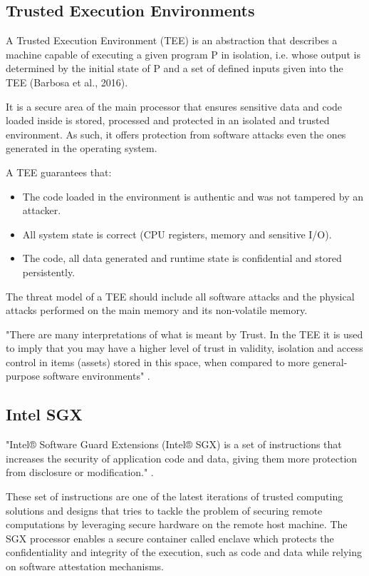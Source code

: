 \subsection{Trusted Execution Environments} %
\label{ssec:trusted_execution_environments}

A Trusted Execution Environment (\gls{TEE}) is an abstraction that describes a machine
capable of executing a given program P in isolation, i.e. whose output is determined by
the initial state of P and a set of defined inputs given into the \gls{TEE} (Barbosa et al., 2016).

It is a secure area of the main processor that ensures sensitive data and code loaded inside is stored, processed and protected in an isolated and trusted environment. As such, it offers protection from software attacks even the ones generated in the operating system.

A \gls{TEE} guarantees that: 
\begin{itemize}
	\item The code loaded in the environment is authentic and was not tampered by an attacker.
	\item All system state is correct (CPU registers, memory and sensitive I/O).
	\item The code, all data generated and runtime state is confidential and stored persistently.
\end{itemize}

The threat model of a \gls{TEE} should include all software attacks and the physical attacks performed on the main memory and its non-volatile memory.

"There are many interpretations of what is meant by Trust. In the \gls{TEE} it is used to imply that you may have a higher level of trust in validity, isolation and access control in items (assets) stored in this space, when compared to more general-purpose software environments" \cite{tee:1}.

\subsection{Intel SGX} %
\label{ssec:intel_sgx}

"Intel® Software Guard Extensions (Intel® SGX) is a set of instructions that increases the security of application code and data, giving them more protection from disclosure or modification." \cite{sgx:3}.

These set of instructions are one of the latest iterations of trusted computing solutions and designs that tries to tackle the problem of securing remote computations by leveraging secure hardware on the remote host machine. The SGX processor enables a secure container called enclave which protects the confidentiality and integrity of the execution, such as code and data while relying on software attestation mechanisms.

